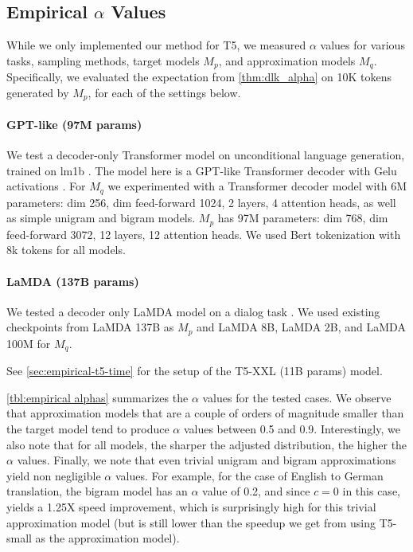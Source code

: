 \documentclass[nohyperref]{article}
\theoremstyle{plain}
\theoremstyle{definition}
\theoremstyle{remark}
\begin{document}
\subsection{Empirical $\alpha$ Values}
\label{sec:empirical_alphas}

While we only implemented our method for T5, we measured $\alpha$ values for various tasks, sampling methods, target models $M_p$, and approximation models $M_q$. Specifically, we evaluated the expectation from \cref{thm:dlk_alpha} on 10K tokens generated by $M_p$, for each of the settings below.

\paragraph{GPT-like (97M params)}We test a decoder-only Transformer model on unconditional language generation, trained on lm1b \citep{lm1b}. The model here is a GPT-like Transformer decoder with Gelu activations \citep{gelu}. For $M_q$ we experimented with a Transformer decoder model with 6M parameters: dim 256, dim feed-forward 1024, 2 layers, 4 attention heads, as well as simple unigram and bigram models. $M_p$ has 97M parameters: dim 768, dim feed-forward 3072, 12 layers, 12 attention heads. We used Bert tokenization \citep{bert} with 8k tokens for all models.

\paragraph{LaMDA (137B params)} We tested a decoder only LaMDA model on a dialog task \citep{lamda}.
We used existing checkpoints from LaMDA 137B as $M_p$ and LaMDA 8B, LaMDA 2B, and LaMDA 100M for $M_q$.

See \cref{sec:empirical-t5-time} for the setup of the T5-XXL (11B params) model.

\cref{tbl:empirical alphas} summarizes the $\alpha$ values for the tested cases. We observe that approximation models that are a couple of orders of magnitude smaller than the target model tend to produce $\alpha$ values between 0.5 and 0.9. Interestingly, we also note that for all models, the sharper the adjusted distribution, the higher the $\alpha$ values. Finally, we note that even trivial unigram and bigram approximations yield non negligible $\alpha$ values. For example, for the case of English to German translation, the bigram model has an $\alpha$ value of 0.2, and since $c=0$ in this case, yields a 1.25X speed improvement, which is surprisingly high for this trivial approximation model (but is still lower than the speedup we get from using T5-small as the approximation model).
\end{document}
